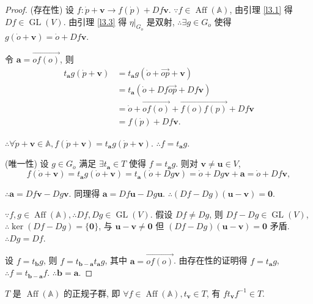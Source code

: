 \documentclass{ctexart}
\begin{document}
\begin{proof}
    (存在性) 设 $f:\dot{p}+\boldsymbol{v}\to f(\dot{p})+Df\boldsymbol{v}$. $\because f\in\operatorname{Aff}(\mathbb{A})$, 由引理 \ref{l3.1} 得 $Df\in\operatorname{GL}(V)$. 由引理 \ref{l3.3} 得 $\eta|_{G_{\dot{o}}}$ 是双射, $\therefore\exists g\in G_{\dot{o}}$ 使得 $g(\dot{o}+\boldsymbol{v})=\dot{o}+Df\boldsymbol{v}$.

    令 $\boldsymbol{a}=\overrightarrow{of(o)}$, 则
    \begin{align*}
        t_{\boldsymbol{a}}g(\dot{p}+\boldsymbol{v}) & =t_{\boldsymbol{a}}g(\dot{o}+\overrightarrow{op}+\boldsymbol{v}) \\
        & =t_{\boldsymbol{a}}(\dot{o}+Df\overrightarrow{op}+Df\boldsymbol{v}) \\
        & =\dot{o}+\overrightarrow{of(o)}+\overrightarrow{f(o)f(p)}+Df\boldsymbol{v} \\
        & =f(\dot{p})+Df\boldsymbol{v}.
    \end{align*}

    $\therefore\forall\dot{p}+\boldsymbol{v}\in\mathbb{A},f(\dot{p}+\boldsymbol{v})=t_{\boldsymbol{a}}g(\dot{p}+\boldsymbol{v})$. $\therefore f=t_{\boldsymbol{a}}g$.

    (唯一性) 设 $g\in G_{\dot{o}}$ 满足 $\exists t_{\boldsymbol{a}}\in T$ 使得 $f=t_{\boldsymbol{a}}g$. 则对 $\boldsymbol{v}\neq\boldsymbol{u}\in V$,
    \[f(\dot{o}+\boldsymbol{v})=t_{\boldsymbol{a}}g(\dot{o}+\boldsymbol{v})=t_{\boldsymbol{a}}(\dot{o}+Dg\boldsymbol{v})=\dot{o}+Dg\boldsymbol{v}+\boldsymbol{a}=\dot{o}+Df\boldsymbol{v},\]

    $\therefore\boldsymbol{a}=Df\boldsymbol{v}-Dg\boldsymbol{v}$. 同理得 $\boldsymbol{a}=Df\boldsymbol{u}-Dg\boldsymbol{u}$. $\therefore(Df-Dg)(\boldsymbol{u}-\boldsymbol{v})=\boldsymbol{0}$.

    $\because f,g\in\operatorname{Aff}(\mathbb{A}),\therefore Df,Dg\in\operatorname{GL}(V)$. 假设 $Df\neq Dg$, 则 $Df-Dg\in\operatorname{GL}(V)$, $\therefore\ker(Df-Dg)=\{\boldsymbol{0}\}$, 与 $\boldsymbol{u}-\boldsymbol{v}\neq\boldsymbol{0}$ 但 $(Df-Dg)(\boldsymbol{u}-\boldsymbol{v})=\boldsymbol{0}$ 矛盾. $\therefore Dg=Df$.

    设 $f=t_{\boldsymbol{b}}g$, 则 $f=t_{\boldsymbol{b}-\boldsymbol{a}}t_{\boldsymbol{a}}g$, 其中 $\boldsymbol{a}=\overrightarrow{of(o)}$. 由存在性的证明得 $f=t_{\boldsymbol{a}}g$, $\therefore f=t_{\boldsymbol{b}-\boldsymbol{a}}f$. $\therefore\boldsymbol{b}=\boldsymbol{a}$.
\end{proof}
\begin{theorem}\label{t3.2}
    $T$ 是 $\operatorname{Aff}(\mathbb{A})$ 的正规子群, 即 $\forall f\in\operatorname{Aff}(\mathbb{A}),t_{\boldsymbol{v}}\in T$, 有 $ft_{\boldsymbol{v}}f^{-1}\in T$.
\end{theorem}
\end{document}
